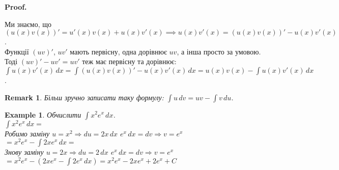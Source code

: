 \documentclass[a4paper, 10pt]{article}
\makeatletter
\def\huge{\displaystyle}
\def\qed{$\blacksquare$}
\theoremstyle{theoremdd}
\theoremstyle{theoremdd}
\theoremstyle{theoremdd}
\theoremstyle{theoremdd}
\theoremstyle{theoremdd}
\newtheorem{example}[theorem]{Example}
\theoremstyle{theoremdd}
\theoremstyle{theoremdd}
\newtheorem{remark}[theorem]{Remark}
\theoremstyle{theoremdd}
\theoremstyle{theoremdd}
\renewenvironment{proof}[1][Proof.\\]{\par
\pushQED{\hfill \qed}%
\normalfont \topsep6\p@\@plus6\p@\relax
\trivlist
\item\relax
{\bfseries
#1\@addpunct{.}}\hspace\labelsep\ignorespaces
}{%
\popQED\endtrivlist\@endpefalse
}
\makeatother
\begin{document}
\begin{proof}
Ми знаємо, що $(u(x)v(x))' = u'(x)v(x) + u(x)v'(x) \implies u(x)v'(x) = (u(x)v(x))' - u(x)v'(x)$.\\
Функції $(uv)'$, $uv'$ мають первісну, одна дорівнює $uv$, а інша просто за умовою. Тоді $(uv)' - uv' = uv'$ теж має первісну та дорівнює:\\
$\huge\int u(x)v'(x)\,dx = \int (u(x)v(x))' - u(x)v'(x)\,dx = u(x)v(x) - \int u(x)v'(x)\,dx$.
\end{proof}

\begin{remark}
Більш зручно записати таку формулу: $\huge \int u\,dv = uv - \int v\,du$.
\end{remark}

\begin{example}
Обчислити $\huge \int x^2 e^x \,dx$.\\
$\huge \int x^2 e^x \,dx \boxed{=}$\\
Робимо заміну $u = x^2 \Rightarrow du = 2x\,dx$ \hspace{1cm} $e^x\,dx = dv \Rightarrow v = e^x$\\
$\boxed{=} x^2 e^x - \huge \int 2x e^x\,dx \boxed{\boxed{=}}$\\
Знову заміну $u = 2x \Rightarrow du = 2\,dx$ \hspace{1cm} $e^x\,dx = dv \Rightarrow v = e^x$\\
$\boxed{\boxed{=}} x^2 e^x - (2xe^x - \huge \int 2e^x \,dx) = x^2 e^x - 2xe^x + 2e^x + C$
\end{example}
\end{document}

